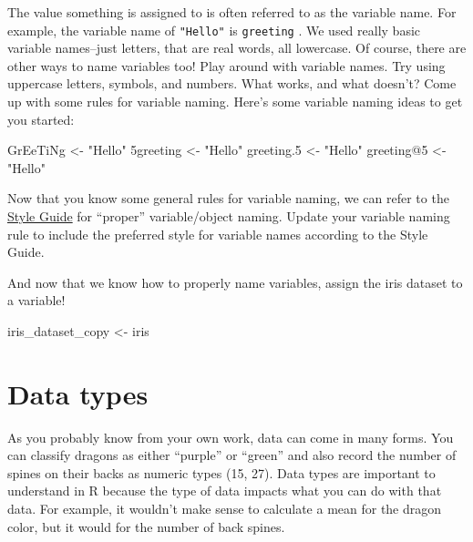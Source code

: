 \documentclass[
  letterpaper,
  DIV=11,
  numbers=noendperiod]{scrreprt}
\newenvironment{Shaded}{\begin{snugshade}}{\end{snugshade}}
\newcommand{\DecValTok}[1]{\textcolor[rgb]{0.68,0.00,0.00}{#1}}
\newcommand{\FloatTok}[1]{\textcolor[rgb]{0.68,0.00,0.00}{#1}}
\newcommand{\NormalTok}[1]{\textcolor[rgb]{0.00,0.23,0.31}{#1}}
\newcommand{\OtherTok}[1]{\textcolor[rgb]{0.00,0.23,0.31}{#1}}
\newcommand{\SpecialCharTok}[1]{\textcolor[rgb]{0.37,0.37,0.37}{#1}}
\newcommand{\StringTok}[1]{\textcolor[rgb]{0.13,0.47,0.30}{#1}}
\begin{document}
The value something is assigned to is often referred to as the variable
name. For example, the variable name of \texttt{"Hello"} is
\texttt{greeting} . We used really basic variable names--just letters,
that are real words, all lowercase. Of course, there are other ways to
name variables too! Play around with variable names. Try using uppercase
letters, symbols, and numbers. What works, and what doesn't? Come up
with some rules for variable naming. Here's some variable naming ideas
to get you started:

\begin{Shaded}
\begin{Highlighting}[]
\NormalTok{GrEeTiNg }\OtherTok{\textless{}{-}} \StringTok{"Hello"}
\NormalTok{5greeting }\OtherTok{\textless{}{-}} \StringTok{"Hello"}
\NormalTok{greeting}\FloatTok{.5} \OtherTok{\textless{}{-}} \StringTok{"Hello"}
\NormalTok{greeting}\SpecialCharTok{@}\DecValTok{5} \OtherTok{\textless{}{-}} \StringTok{"Hello"}
\end{Highlighting}
\end{Shaded}

Now that you know some general rules for variable naming, we can refer
to the \href{https://style.tidyverse.org/syntax.html\#syntax}{Style
Guide} for ``proper'' variable/object naming. Update your variable
naming rule to include the preferred style for variable names according
to the Style Guide.

And now that we know how to properly name variables, assign the iris
dataset to a variable!

\begin{Shaded}
\begin{Highlighting}[]
\NormalTok{iris\_dataset\_copy }\OtherTok{\textless{}{-}}\NormalTok{ iris}
\end{Highlighting}
\end{Shaded}

\hypertarget{data-types}{%
\section{Data types}\label{data-types}}

As you probably know from your own work, data can come in many forms.
You can classify dragons as either ``purple'' or ``green'' and also
record the number of spines on their backs as numeric types (15, 27).
Data types are important to understand in R because the type of data
impacts what you can do with that data. For example, it wouldn't make
sense to calculate a mean for the dragon color, but it would for the
number of back spines.
\end{document}
